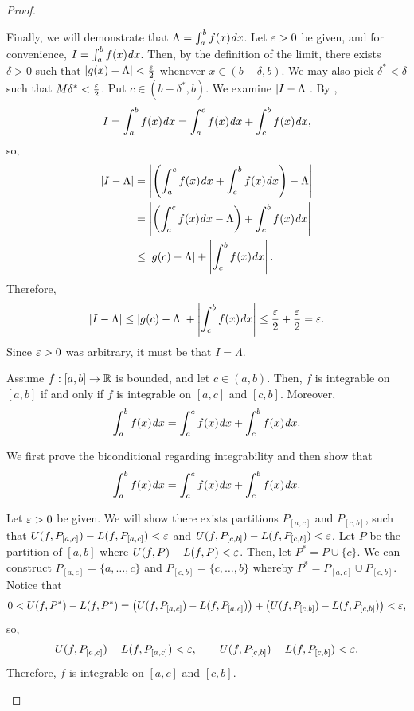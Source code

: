 \begin{problem}
\begin{proof}
\begin{subproof}
      Finally, we will demonstrate that $\Lambda = \int_{a}^{b} f(x) \mathit{d} x$.
      Let $\varepsilon > 0$ be given, and for convenience, $I = \int_a^b f(x) \mathit{d} x$. 
      Then, by the definition of the limit, there exists $\delta > 0$ such that
      $\left\lvert  g(x) - \Lambda  \right\rvert < \frac{\varepsilon}{2}$ whenever $x \in (b - \delta, b)$. We may also pick 
      $\delta^{*} < \delta$ such that $M \delta^{*} < \frac{\varepsilon}{2}$. Put $c \in (b - \delta^{*}, b)$.
      We examine $\left\lvert  I - \Lambda \right\rvert $. By ,
      \[
        I = \int_{a}^{b} f(x) \mathit{d} x = \int_{a}^{c} f(x) \mathit{d} x + \int_{c}^{b} f(x) \mathit{d} x,
      \]
      so,
      \begin{align*}
        \left\lvert I - \Lambda \right\rvert &= \left\lvert  \left( \int_a^c f(x) \mathit{d} x + \int_c^b f(x) \mathit{d} x \right) - \Lambda  \right\rvert \\
                          &= \left\lvert  \left( \int_a^c f(x) \mathit{d} x - \Lambda \right) + \int_c^b f(x) \mathit{d} x  \right\rvert \\
                          &\leq \left\lvert  g(c) - \Lambda  \right\rvert + \left\lvert  \int_c^b f(x) \mathit{d} x  \right\rvert.
      \end{align*}
      Therefore,
      \[
        \left\lvert I - \Lambda \right\rvert \leq \left\lvert  g(c) - \Lambda  \right\rvert + \left\lvert  \int_c^b f(x) \mathit{d} x  \right\rvert \leq \frac{\varepsilon}{2} +  \frac{\varepsilon}{2} = \varepsilon.
      \]
      Since $\varepsilon > 0$ was arbitrary, it must be that $I = \Lambda$.
    \end{subproof}

    \begin{lemma}
      \label{lem:integral-interval-additivity}
      Assume $f : [a, b] \to \mathbb{R}$ is bounded, and let $c \in (a, b)$. Then, $f$ is integrable on $[a, b]$ if and only if $f$ is integrable 
      on $[a, c]$ and $[c, b]$. Moreover,
      \[
        \int_{a}^{b} f(x) \mathit{d} x = \int_{a}^{c} f(x) \mathit{d} x + \int_{c}^{b} f(x) \mathit{d} x.
      \]
    \end{lemma}

    \begin{subproof}
      We first prove the biconditional regarding integrability and then show that 
      \[ 
        \int_{a}^{b} f(x) \mathit{d} x = \int_{a}^{c} f(x) \mathit{d} x + \int_{c}^{b} f(x) \mathit{d} x. 
      \]

      \begin{forwardimplication}
        Let $\varepsilon > 0$ be given. We will show there exists partitions $P_{[a,c]}$ and $P_{[c,b]}$, such that
        $U(f, P_{[a,c]}) - L(f, P_{[a,c]}) < \varepsilon$ and $U(f, P_{[c,b]}) - L(f, P_{[c,b]}) < \varepsilon$.
        Let $P$ be the partition of $[a, b]$ where 
        $U(f, P) - L(f, P) < \varepsilon$. Then, let $P^{*} = P \cup \{c\}$. We can construct 
        $P_{[a, c]} = \{a, \ldots, c\}$ and $P_{[c, b]} = \{c, \ldots, b\}$ whereby 
        $P^{*} = P_{[a, c]} \cup P_{[c, b]}$. Notice that
        \[
          0 < U(f, P^{*}) - L(f, P^{*}) = \left( U(f, P_{[a, c]}) - L(f, P_{[a, c]}) \right) + \left( U(f, P_{[c, b]}) - L(f, P_{[c, b]}) \right)  < \varepsilon,
        \]
        so,
        \[
          U(f, P_{[a, c]}) - L(f, P_{[a, c]}) < \varepsilon, \qquad U(f, P_{[c, b]}) - L(f, P_{[c, b]}) < \varepsilon.
        \]
        Therefore, $f$ is integrable on $[a, c]$ and $[c, b]$.
      \end{forwardimplication}


\end{subproof}
\end{proof}
\end{problem}
